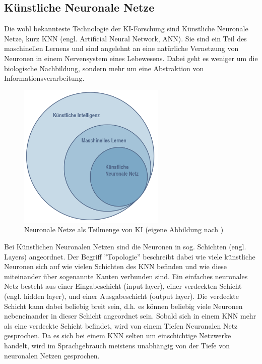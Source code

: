 \documentclass[a4paper,12pt, german]{report}
\begin{document}
\subsection{Künstliche Neuronale Netze}

Die wohl bekannteste Technologie der KI-Forschung sind Künstliche Neuronale Netze, kurz KNN (engl. Artificial Neural Network, ANN). Sie sind ein Teil des maschinellen Lernens und sind angelehnt an eine natürliche Vernetzung von Neuronen in einem Nervensystem eines Lebewesens. Dabei geht es weniger um die biologische Nachbildung, sondern mehr um eine Abstraktion von Informationsverarbeitung.\cite{17}

\begin{figure}[H]
  \center
 \includegraphics[width=7cm]{images/EinordnungKNN.pptx.png}
  \caption[Neuronale Netze als Teilmenge von KI]{Neuronale Netze als Teilmenge von KI (eigene Abbildung nach \cite{17})}
\end{figure}

Bei Künstlichen Neuronalen Netzen sind die Neuronen in sog. Schichten (engl. Layers) angeordnet. Der Begriff ''Topologie'' beschreibt dabei wie viele künstliche Neuronen sich auf wie vielen Schichten des KNN befinden und wie diese miteinander über sogenannte Kanten verbunden sind. Ein einfaches neuronales Netz besteht aus einer Eingabeschicht (input layer), einer verdeckten Schicht (engl. hidden layer), und einer Ausgabeschicht (output layer). Die verdeckte Schicht kann dabei beliebig breit sein, d.h. es können beliebig viele Neuronen nebeneinander in dieser Schicht angeordnet sein. Sobald sich in einem KNN mehr als eine verdeckte Schicht befindet, wird von einem Tiefen Neuronalen Netz gesprochen. Da es sich bei einem KNN selten um einschichtige Netzwerke handelt, wird im Sprachgebrauch meistens unabhängig von der Tiefe von neuronalen Netzen gesprochen.\cite{17}
\end{document}
